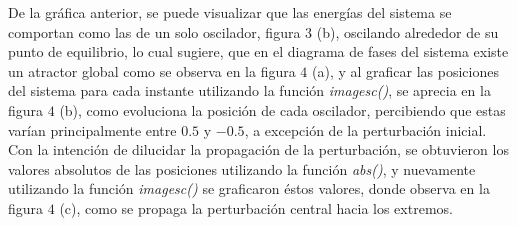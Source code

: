 \documentclass[11pt,letterpaper,twocolumn]{article}
\begin{document}
\par 
De la gráfica anterior, se puede visualizar que las energías del sistema se comportan como las de un solo oscilador, figura $3$ (b), oscilando alrededor de su punto de equilibrio, lo cual sugiere, que en el diagrama de fases del sistema existe un atractor global como se observa en la figura $4$ (a), y al graficar las posiciones del sistema para cada instante utilizando la función \textit{imagesc()}, se aprecia en la figura $4$ (b), como evoluciona la posición de cada oscilador, percibiendo que estas varían principalmente entre $0.5$ y $-0.5$, a excepción de la perturbación inicial. Con la intención de dilucidar la propagación de la perturbación, se obtuvieron los valores absolutos de las posiciones utilizando la función \textit{abs()}, y nuevamente utilizando la función \textit{imagesc()} se graficaron éstos valores, donde observa en la figura $4$ (c), como se propaga la perturbación central hacia los extremos.\\
\end{document}
